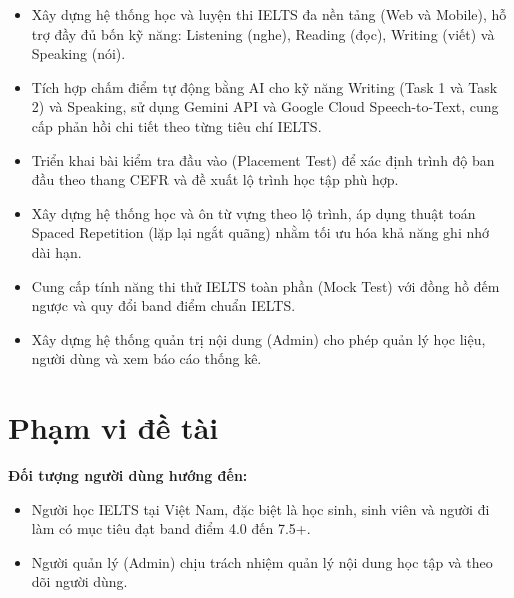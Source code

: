 \documentclass[a4paper,12pt]{extreport}
\begin{document}
\begin{itemize}
    \item Xây dựng hệ thống học và luyện thi IELTS đa nền tảng (Web và Mobile), hỗ trợ đầy đủ bốn kỹ năng: Listening (nghe), Reading (đọc), Writing (viết) và Speaking (nói).
    \item Tích hợp chấm điểm tự động bằng AI cho kỹ năng Writing (Task 1 và Task 2) và Speaking, sử dụng Gemini API và Google Cloud Speech-to-Text, cung cấp phản hồi chi tiết theo từng tiêu chí IELTS.
    \item Triển khai bài kiểm tra đầu vào (Placement Test) để xác định trình độ ban đầu theo thang CEFR và đề xuất lộ trình học tập phù hợp.
    \item Xây dựng hệ thống học và ôn từ vựng theo lộ trình, áp dụng thuật toán Spaced Repetition (lặp lại ngắt quãng) nhằm tối ưu hóa khả năng ghi nhớ dài hạn.
    \item Cung cấp tính năng thi thử IELTS toàn phần (Mock Test) với đồng hồ đếm ngược và quy đổi band điểm chuẩn IELTS.
    \item Xây dựng hệ thống quản trị nội dung (Admin) cho phép quản lý học liệu, người dùng và xem báo cáo thống kê.
\end{itemize}

\section{Phạm vi đề tài}

\textbf{Đối tượng người dùng hướng đến:}
\begin{itemize}
    \item Người học IELTS tại Việt Nam, đặc biệt là học sinh, sinh viên và người đi làm có mục tiêu đạt band điểm 4.0 đến 7.5+.
    \item Người quản lý (Admin) chịu trách nhiệm quản lý nội dung học tập và theo dõi người dùng.
\end{itemize}
\end{document}
